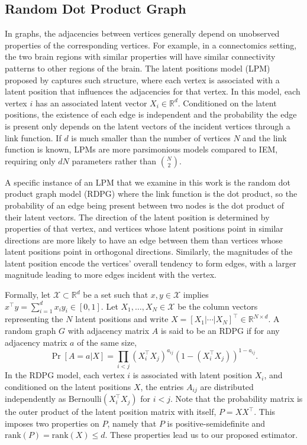 \documentclass[10pt,letterpaper]{article}
\renewcommand{\Re}{\mathbb{R}}
\begin{document}
\subsection{Random Dot Product Graph}
In graphs, the adjacencies between vertices generally depend on unobserved properties of the corresponding vertices. For example, in a connectomics setting, the two brain regions with similar properties will have similar connectivity patterns to other regions of the brain.
The latent positions model (LPM) proposed by \citep{hoff2002latent} captures such structure, where each vertex is associated with a latent position that influences the adjacencies for that vertex.
In this model, each vertex $i$ has an associated latent vector $X_i \in \Re^d$.
Conditioned on the latent positions, the existence of each edge is independent and the probability the edge is present only depends on the latent vectors of the incident vertices through a link function. If $d$ is much smaller than the number of vertices $N$ and the link function is known, LPMs are more parsimonious models compared to IEM, requiring only $dN$ parameters rather than $\binom{N}{2}$.

A specific instance of an LPM that we examine in this work is the random dot product graph model (RDPG) \citep{young2007random, nickel2007random} where the link function is the dot product, so the probability of an edge being present between two nodes is the dot product of their latent vectors.
The direction of the latent position is determined by properties of that vertex, and vertices whose latent positions point in similar directions are more likely to have an edge between them than vertices whose latent positions point in orthogonal directions.
Similarly, the magnitudes of the latent position encode the vertices' overall tendency to form edges, with a larger magnitude leading to more edges incident with the vertex.

Formally, let $\mathcal{X} \subset \Re^d$ be a set such that $x, y \in \mathcal{X}$ implies $x^{\top} y =\sum_{i = 1}^d x_i y_i \in [0, 1]$.
Let $X_1,\dotsc,X_N\in \mathcal{X}$ be the column vectors representing the $N$ latent positions and write $X = [X_1|\cdots|X_N]^{\top} \in \Re^{N \times d}$.
A random graph $G$ with adjacency matrix $A$ is said to be an RDPG if for any adjacency matrix $a$ of the same size,
\[
    \Pr[A = a|X] = \prod_{i<j} (X_i^{\top} X_j)^{a_{ij}} ( 1 - (X_i^{\top} X_j))^{1 - a_{ij}}.
\]
In the RDPG model, each vertex $i$ is associated with latent position $X_i$, and conditioned on the latent positions $X$, the entries $A_{ij}$ are distributed independently as $ \text{Bernoulli}(X_i^{\top} X_j)$ for $i<j$.
Note that the probability matrix is the outer product of the latent position matrix with itself, $P = X X^{\top}$.
This imposes two properties on $P$, namely that $P$ is positive-semidefinite and $\mathrm{rank}(P)=\mathrm{rank}(X)\leq d$.
These properties lead us to our proposed estimator.
\end{document}

